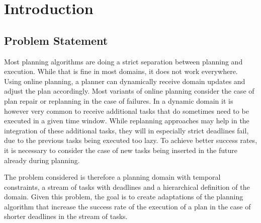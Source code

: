 \section{Introduction}\label{sec:introduction}


\subsection{Problem Statement}

Most planning algorithms are doing a strict separation between planning and execution.
While that is fine in most domains, it does not work everywhere.
Using online planning, a planner can dynamically receive domain updates and adjust the plan accordingly.
Most variants of online planning consider the case of plan repair or replanning in the case of failures.
In a dynamic domain it is however very common to receive additional tasks that do sometimes need to be executed in a given time window.
While replanning approaches may help in the integration of these additional tasks, they will in especially strict deadlines fail, due to the previous tasks being executed too lazy.
To achieve better success rates, it is necessary to consider the case of new tasks being inserted in the future already during planning.

The problem considered is therefore a planning domain with temporal constraints, a stream of tasks with deadlines and a hierarchical definition of the domain.
Given this problem, the goal is to create adaptations of the planning algorithm that increase the success rate of the execution of a plan in the case of shorter deadlines in the stream of tasks.